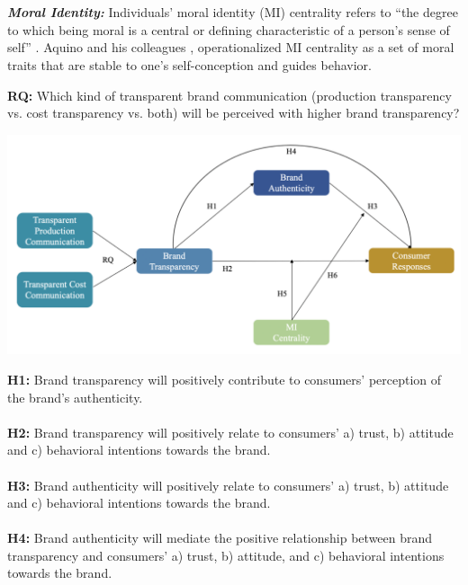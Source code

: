 \documentclass[a0,portrait]{a0poster}
\begin{document}
\begin{minipage}[c]{\linewidth}
\begin{framed}
\begin{multicols}{2}
\\ 
\\
    \color{Maroon} \textbf{\emph{Moral Identity:}} \color{Black}Individuals’ moral identity (MI) centrality refers to “the degree to which being moral is a central or defining characteristic of a person’s sense of self” \autocite{blasi_moral_1994}.
    Aquino and his colleagues \autocite{aquino_self-importance_2002}\autocite{aquino_testing_2009}, operationalized MI centrality as a set of moral traits that are stable to one’s self-conception and guides behavior. 
    \\
   \begin{center}
  \color{Maroon} \textbf{RQ:} \color{Black}  Which kind of transparent brand communication (production transparency vs. cost transparency vs. both) will be perceived with higher brand transparency? \\
  \end{center}
\begin{center}
\includegraphics[width=0.9\linewidth]{figures/Figure1}
\label{ALICerros}
\end{center}
\color{Maroon}
\textbf{H1:} \color{Black}Brand transparency will positively contribute to consumers' perception of the brand's authenticity. \\
\\
\color{Maroon}
\textbf{H2:} \color{Black} Brand transparency will positively relate to consumers’ a) trust, b) attitude and c) behavioral intentions towards the brand.\\
\\
\color{Maroon}
\textbf{H3:} \color{Black} Brand authenticity will positively relate to consumers’ a) trust, b) attitude and c) behavioral intentions towards the brand.\\
\\
\color{Maroon}
\textbf{H4:} \color{Black} Brand authenticity will mediate the positive relationship between brand transparency and consumers’ a) trust, b) attitude, and c) behavioral intentions towards the brand.\\

\end{multicols}
\end{framed}
\end{minipage}
\end{document}
